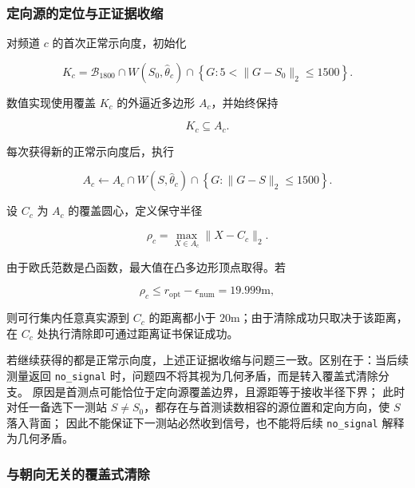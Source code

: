 \subsubsection{定向源的定位与正证据收缩}

对频道 $c$ 的首次正常示向度，初始化

\begin{equation}
K_c=
\mathcal B_{1800}
\cap
W(S_0,\hat\theta_c)
\cap
\left\{
G:
5<\lVert G-S_0\rVert_2\le1500
\right\}.
\label{eq:q4_initial_region}
\end{equation}

数值实现使用覆盖 $K_c$ 的外逼近多边形 $A_c$，并始终保持

\begin{equation}
K_c\subseteq A_c.
\label{eq:q4_outer_contain}
\end{equation}

每次获得新的正常示向度后，执行

\begin{equation}
A_c\leftarrow
A_c\cap W(S,\hat\theta_c)\cap
\left\{
G:
\lVert G-S\rVert_2\le1500
\right\}.
\label{eq:q4_region_update}
\end{equation}

设 $C_c$ 为 $A_c$ 的覆盖圆心，定义保守半径

\begin{equation}
\rho_c=\max_{X\in A_c}\lVert X-C_c\rVert_2.
\label{eq:q4_outer_radius}
\end{equation}

由于欧氏范数是凸函数，最大值在凸多边形顶点取得。若

\begin{equation}
\rho_c\le r_{\mathrm{opt}}-\epsilon_{\mathrm{num}}
=19.999\mathrm{m},
\label{eq:q4_clear_certificate}
\end{equation}

则可行集内任意真实源到 $C_c$ 的距离都小于 $20\mathrm{m}$；由于清除成功只取决于该距离，在 $C_c$ 处执行清除即可通过距离证书保证成功。

若继续获得的都是正常示向度，上述正证据收缩与问题三一致。区别在于：当后续测量返回 \texttt{no\_signal} 时，问题四不将其视为几何矛盾，而是转入覆盖式清除分支。
原因是首测点可能恰位于定向源覆盖边界，且源距等于接收半径下界；
此时对任一备选下一测站 $S\ne S_0$，都存在与首测读数相容的源位置和定向方向，使 $S$ 落入背面；
因此不能保证下一测站必然收到信号，也不能将后续 \texttt{no\_signal} 解释为几何矛盾。

\subsubsection{与朝向无关的覆盖式清除}

